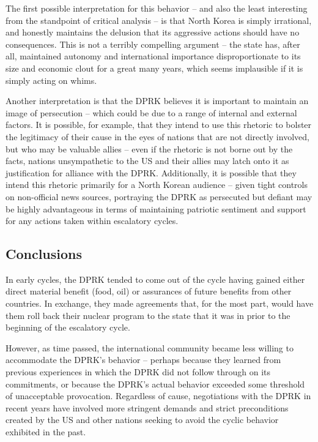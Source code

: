 \documentclass{article}
\begin{document}
The first possible interpretation for this behavior – and also the least interesting from the standpoint of critical analysis – is that North Korea is simply irrational, and honestly maintains the delusion that its aggressive actions should have no consequences. This is not a terribly compelling argument – the state has, after all, maintained autonomy and international importance disproportionate to its size and economic clout for a great many years, which seems implausible if it is simply acting on whims.

Another interpretation is that the DPRK believes it is important to maintain an image of persecution – which could be due to a range of internal and external factors. It is possible, for example, that they intend to use this rhetoric to bolster the legitimacy of their cause in the eyes of nations that are not directly involved, but who may be valuable allies – even if the rhetoric is not borne out by the facts, nations unsympathetic to the US and their allies may latch onto it as justification for alliance with the DPRK. Additionally, it is possible that they intend this rhetoric primarily for a North Korean audience – given tight controls on non-official news sources, portraying the DPRK as persecuted but defiant may be highly advantageous in terms of maintaining patriotic sentiment and support for any actions taken within escalatory cycles.

\subsection{Conclusions}
In early cycles, the DPRK tended to come out of the cycle having gained either direct material benefit (food, oil) or assurances of future benefits from other countries. In exchange, they made agreements that, for the most part, would have them roll back their nuclear program to the state that it was in prior to the beginning of the escalatory cycle.

However, as time passed, the international community became less willing to accommodate the DPRK’s behavior – perhaps because they learned from previous experiences in which the DPRK did not follow through on its commitments, or because the DPRK’s actual behavior exceeded some threshold of unacceptable provocation. Regardless of cause, negotiations with the DPRK in recent years have involved more stringent demands and strict preconditions created by the US and other nations seeking to avoid the cyclic behavior exhibited in the past.
\end{document}

